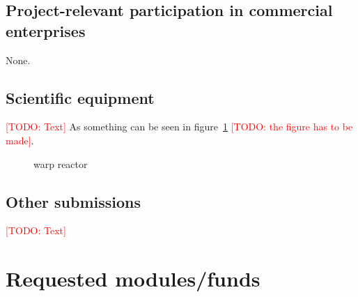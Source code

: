 \documentclass[american,firsttime]{dfgproposal}
\newcommand{\todo}[1]{\xspace{\textcolor{red}{[TODO: #1]}}\xspace}
\begin{document}
	\subsection{Project-relevant participation in commercial enterprises}
	None.
	
	\subsection{Scientific equipment}
	\todo{Text}
	As something can be seen in figure~\ref{fig:some_nice_graph} \todo{the figure has to be made}.
	\begin{figure}
		\centering
		\caption{warp reactor}
		\label{fig:some_nice_graph}
	\end{figure}
	
	\subsection{Other submissions}
	\todo{Text}
	
	
	\section{Requested modules/funds}
	
\end{document}
